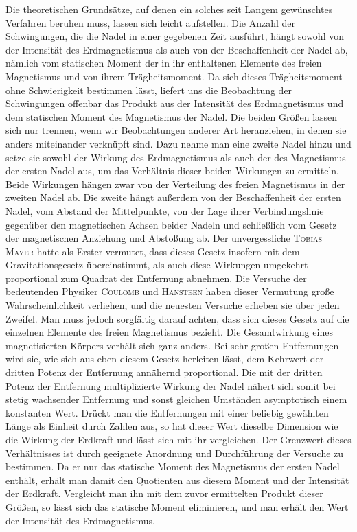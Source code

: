 Die theoretischen Grundsätze, auf denen ein solches seit Langem gewünschtes Verfahren beruhen muss, lassen sich leicht aufstellen. Die Anzahl der Schwingungen, die die Nadel in einer gegebenen Zeit ausführt, hängt sowohl von der Intensität des Erdmagnetismus als auch von der Beschaffenheit der Nadel ab, nämlich vom statischen Moment der in ihr enthaltenen Elemente des freien Magnetismus und von ihrem Trägheitsmoment. Da sich dieses Trägheitsmoment ohne Schwierigkeit bestimmen lässt, liefert uns die Beobachtung der Schwingungen offenbar das Produkt aus der Intensität des Erdmagnetismus und dem statischen Moment des Magnetismus der Nadel. Die beiden Größen lassen sich nur trennen, wenn wir Beobachtungen anderer Art heranziehen, in denen sie anders miteinander verknüpft sind. Dazu nehme man eine zweite Nadel hinzu und setze sie sowohl der Wirkung des Erdmagnetismus als auch der des Magnetismus der ersten Nadel aus, um das Verhältnis dieser beiden Wirkungen zu ermitteln. Beide Wirkungen hängen zwar von der Verteilung des freien Magnetismus in der zweiten Nadel ab. Die zweite hängt außerdem von der Beschaffenheit der ersten Nadel, vom Abstand der Mittelpunkte, von der Lage ihrer Verbindungslinie gegenüber den magnetischen Achsen beider Nadeln und schließlich vom Gesetz der magnetischen Anziehung und Abstoßung ab. Der unvergessliche \textsc{Tobias Mayer} hatte als Erster vermutet, dass dieses Gesetz insofern mit dem Gravitationsgesetz übereinstimmt, als auch diese Wirkungen umgekehrt proportional zum Quadrat der Entfernung abnehmen. Die Versuche der bedeutenden Physiker \textsc{Coulomb} und \textsc{Hansteen} haben dieser Vermutung große Wahrscheinlichkeit verliehen, und die neuesten Versuche erheben sie über jeden Zweifel. Man muss jedoch sorgfältig darauf achten, dass sich dieses Gesetz auf die einzelnen Elemente des freien Magnetismus bezieht. Die Gesamtwirkung eines magnetisierten Körpers verhält sich ganz anders. Bei sehr großen Entfernungen wird sie, wie sich aus eben diesem Gesetz herleiten lässt, dem Kehrwert der dritten Potenz der Entfernung annähernd proportional. Die mit der dritten Potenz der Entfernung multiplizierte Wirkung der Nadel nähert sich somit bei stetig wachsender Entfernung und sonst gleichen Umständen asymptotisch einem konstanten Wert. Drückt man die Entfernungen mit einer beliebig gewählten Länge als Einheit durch Zahlen aus, so hat dieser Wert dieselbe Dimension wie die Wirkung der Erdkraft und lässt sich mit ihr vergleichen. Der Grenzwert dieses Verhältnisses ist durch geeignete Anordnung und Durchführung der Versuche zu bestimmen. Da er nur das statische Moment des Magnetismus der ersten Nadel enthält, erhält man damit den Quotienten aus diesem Moment und der Intensität der Erdkraft. Vergleicht man ihn mit dem zuvor ermittelten Produkt dieser Größen, so lässt sich das statische Moment eliminieren, und man erhält den Wert der Intensität des Erdmagnetismus.

